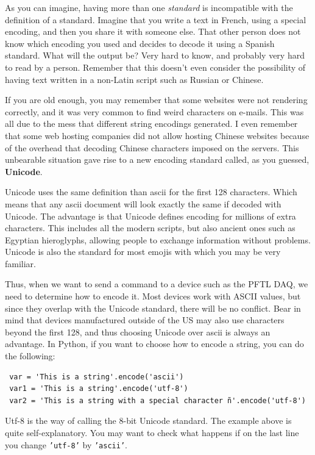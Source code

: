 As you can imagine, having more than one \textit{standard} is incompatible with the definition of a standard. Imagine that you write a text in French, using a special encoding, and then you share it with someone else. That other person does not know which encoding you used and decides to decode it using a Spanish standard. 
What will the output be? Very hard to know, and probably very hard to read by a person. 
Remember that this doesn't even consider the possibility of having text 
written in a non-Latin script such as Russian or Chinese.

If you are old enough, you may remember that some websites were not rendering correctly, and it was very common to find weird characters on e-mails. This was all due to the mess that different string encodings generated. I even remember that some web hosting companies did not allow hosting Chinese websites because of the overhead that decoding Chinese characters imposed on the servers. This unbearable situation gave rise to a new encoding standard called, as you guessed, 
\textbf{Unicode}. 

Unicode uses the same definition than ascii for the first 128 characters. Which means that any ascii document will look exactly the same if decoded with 
Unicode. The advantage is that Unicode defines encoding for millions of extra characters. This includes all the modern scripts, but also ancient ones such as 
Egyptian hieroglyphs, allowing people to exchange information without problems. Unicode is also the standard for most emojis with which you may be very familiar. 

Thus, when we want to send a command to a device such as the {PFTL DAQ}, we need to determine how to encode it. Most devices work with ASCII values, but since they overlap with the 
Unicode standard, there will be no conflict. Bear in mind that devices manufactured outside of the US may also use characters beyond the first 128, and thus choosing Unicode over ascii is always an advantage. In Python, if you want 
to choose how to encode a string, you can do the following:

\begin{verbatim}
 var = 'This is a string'.encode('ascii')
 var1 = 'This is a string'.encode('utf-8')
 var2 = 'This is a string with a special character ñ'.encode('utf-8')
\end{verbatim}

Utf-8 is the way of calling the 8-bit Unicode standard. The example above is quite self-explanatory. You may want to check what happens if on the last line you change \texttt{'utf-8'} by \texttt{'ascii'}. 

